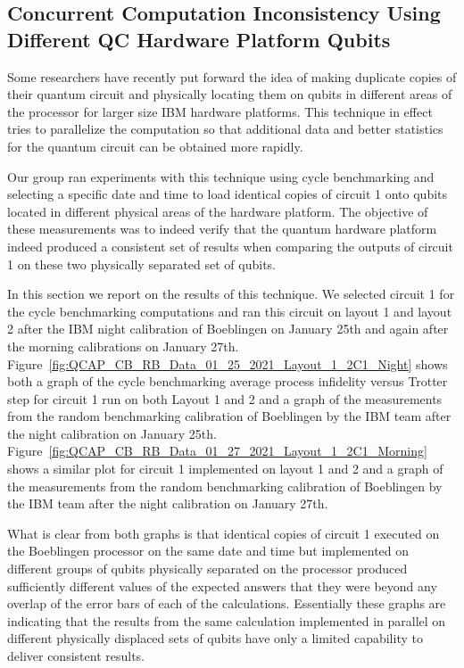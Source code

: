 \subsection{Concurrent Computation Inconsistency Using Different QC Hardware Platform Qubits}
\label{sec:concurrent-computation-inconsistency-analysis}


Some researchers have recently put forward the idea of making duplicate copies of their quantum circuit and physically locating them on qubits in different areas of the processor for larger size IBM hardware platforms.  This technique in effect tries to parallelize the computation so that additional data and better statistics for the quantum circuit can be obtained more rapidly.

Our group ran experiments with this technique using cycle benchmarking and selecting a specific date and time to load identical copies of circuit 1 onto qubits located in different physical areas of the hardware platform.  The objective of these measurements was to indeed verify that the quantum hardware platform indeed produced a consistent set of results when comparing the outputs of circuit 1 on these two physically separated set of qubits.

In this section we report on the results of this technique.  We selected circuit 1 for the cycle benchmarking computations and ran this circuit on layout 1 and layout 2 after the IBM night calibration of Boeblingen on January 25th and again after the morning calibrations on January 27th. Figure~\ref{fig:QCAP_CB_RB_Data_01_25_2021_Layout_1_2C1_Night} shows both a graph of the cycle benchmarking average process infidelity versus Trotter step for circuit 1 run on both Layout 1 and 2 and a graph of the measurements from the random benchmarking calibration of Boeblingen by the IBM team after the night calibration on January 25th.  Figure~\ref{fig:QCAP_CB_RB_Data_01_27_2021_Layout_1_2C1_Morning} shows a similar plot for circuit 1 implemented on layout 1 and 2 and a graph of the measurements from the random benchmarking calibration of Boeblingen by the IBM team after the night calibration on January 27th.

What is clear from both graphs is that identical copies of circuit 1 executed on the Boeblingen processor on the same date and time but implemented on different groups of qubits physically separated on the processor produced sufficiently different values of the expected answers that they were beyond any overlap of the error bars of each of the calculations.  Essentially these graphs are indicating that the results from the same calculation implemented in parallel on different physically displaced sets of qubits have only a limited capability to deliver consistent results.



